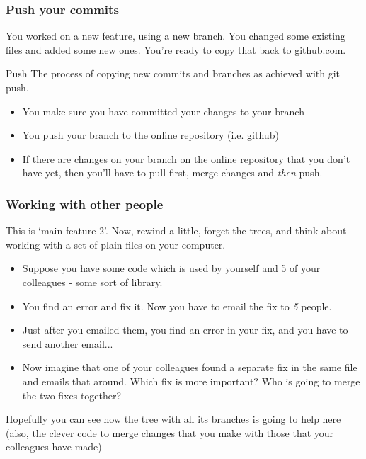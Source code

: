 \documentclass{beamer}
\begin{document}
\begin{frame}
  \frametitle{Push your commits}
  You worked on a new feature, using a new branch. You changed some existing
  files and added some new ones. You're ready to copy that back to github.com.
  \begin{block}{Push}
    The process of copying new commits and branches as achieved with git \alert{push}.
    \begin{itemize}
    \item You make sure you have \alert{committed} your changes to your branch
    \item You \alert{push} your branch to the online repository (i.e. github)
    \item If there are changes on your branch on the online repository that you don't
      have yet, then you'll have to pull first, \alert{merge} changes and
      \emph{then} push.
    \end{itemize}
  \end{block}
\end{frame}

\begin{frame}
  \frametitle{Working with other people} This is `main feature 2'. Now, rewind
  a little, forget the trees, and think about working with a set of plain
  files on your computer.

  \begin{itemize}
    \item Suppose you have some code which is used by yourself and 5 of your
      colleagues - some sort of library.

    \pause \item You find an error and fix it. Now you have to email the fix to \emph{5} people.

    \pause \item Just after you emailed them, you find an error in your fix, and you
    have to send another email...

    \pause \item Now imagine that one of your colleagues found a
    separate fix in the same file and emails that around. Which fix is
    more important? Who is going to merge the two fixes together?
  \end{itemize}

  Hopefully you can see how the tree with all its branches is going to help
  here (also, the clever code to merge changes that you make with those that
  your colleagues have made)
\end{frame}
\end{document}
